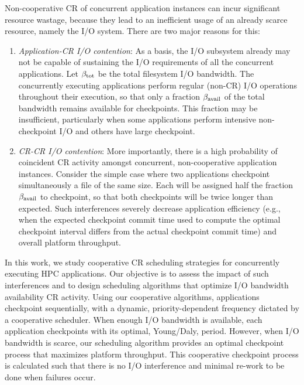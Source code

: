 Non-cooperative CR of concurrent application instances can incur significant resource
wastage, because they lead to an inefficient usage of an already scarce resource,
namely the I/O system.  There are two major reasons for this:
\begin{enumerate}
\item \emph{Application-CR I/O contention}: As a basis, the I/O subsystem already may
  not be capable of sustaining the I/O requirements of all the concurrent
  applications.  Let $\beta_{\text{tot}}$ be the total filesystem I/O bandwidth.  The
  concurrently executing applications perform regular (non-CR) I/O operations
  throughout their execution, so that only a fraction $\beta_{\text{avail}}$ of the total
  bandwidth remains available for checkpoints.  This fraction may be insufficient,
  particularly when some applications perform intensive non-checkpoint I/O and others
  have large checkpoint.

\item \emph{CR-CR I/O contention}: More importantly, there is a high probability of
  coincident CR activity amongst concurrent, non-cooperative application instances.
  Consider the simple case where two applications checkpoint simultaneously a file of
  the same size. Each will be assigned half the fraction $\beta_{\text{avail}}$ to checkpoint,
  so that both checkpoints will be twice longer than expected. Such interferences
  severely decrease application efficiency (e.g., when the expected checkpoint commit
  time used to compute the optimal checkpoint interval differs from the actual
  checkpoint commit time) and overall platform throughput.
\end{enumerate}

In this work, we study cooperative CR scheduling strategies for concurrently
executing HPC applications.  Our objective is to assess the impact of such
interferences and to design scheduling algorithms that optimize I/O bandwidth
availability CR activity.  Using our cooperative algorithms, applications checkpoint
sequentially, with a dynamic, priority-dependent frequency dictated by a cooperative
scheduler.  When enough I/O bandwidth is available, each application checkpoints with
its optimal, Young/Daly, period. However, when I/O bandwidth is scarce, our
scheduling algorithm provides an optimal checkpoint process that maximizes platform
throughput. This cooperative checkpoint process is calculated such that there is no
I/O interference and minimal re-work to be done when failures occur.

